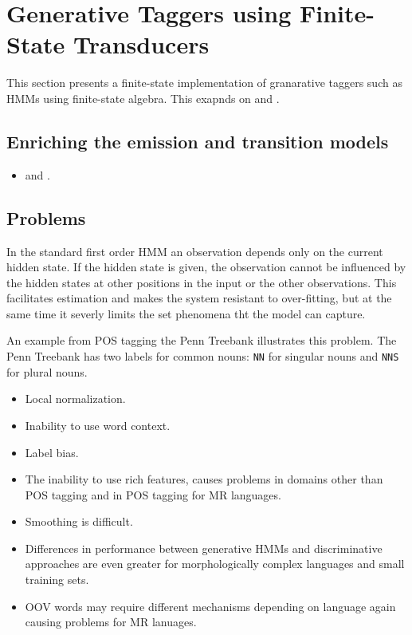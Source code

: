 \chapter{Generative Taggers using Finite-State Transducers}

This section presents a finite-state implementation of granarative taggers such as HMMs using finite-state algebra. This exapnds on \cite{Silfverberg2010} and \cite{Silfverberg2011}.

\section{Enriching the emission and transition models}
\begin{itemize}
\item \cite{Halacsy2007} and \cite{Silfverberg2011}.
\end{itemize}

\section{Problems}
In the standard first order HMM an observation depends only on the
current hidden state. If the hidden state is given, the observation
cannot be influenced by the hidden states at other positions in the
input or the other observations. This facilitates estimation and makes
the system resistant to over-fitting, but at the same time it severly
limits the set phenomena tht the model can capture.

An example from POS tagging the Penn Treebank illustrates this
problem. The Penn Treebank has two labels for common nouns: {\tt NN}
for singular nouns and {\tt NNS} for plural nouns.

\begin{itemize}
\item Local normalization.
\item Inability to use word context.
\item Label bias.
\item The inability to use rich features, causes problems in domains
  other than POS tagging and in POS tagging for MR languages.
\item Smoothing is difficult.
\item Differences in performance between generative HMMs and
  discriminative approaches are even greater for morphologically
  complex languages and small training sets.
\item OOV words may require different mechanisms depending on
  language again causing problems for MR lanuages.
\end{itemize}


